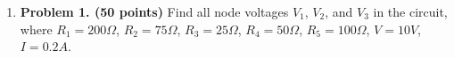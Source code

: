 \begin{enumerate}

\item {\bf Problem 1. (50 points)}
  Find all node voltages $V_1$, $V_2$, and $V_3$ in the circuit, where 
  $R_1=200\Omega$, $R_2=75\Omega$, $R_3=25\Omega$, $R_4=50\Omega$, 
  $R_5=100\Omega$, $V=10V$, $I=0.2A$. 





\end{enumerate}
